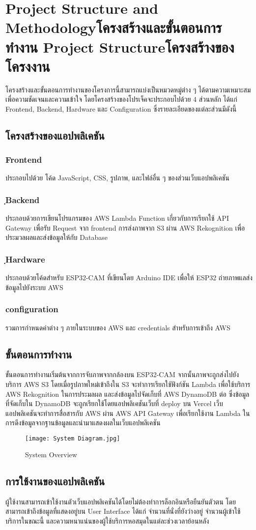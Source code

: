 \chapter{\ifproject%
\ifenglish Project Structure and Methodology\else โครงสร้างและขั้นตอนการทำงาน\fi
\else%
\ifenglish Project Structure\else โครงสร้างของโครงงาน\fi
\fi
}

โครงสร้างและขั้นตอนการทำงานของโครงการนี้สามารถแบ่งเป็นหมวดหมู่ต่าง ๆ ได้ตามความเหมาะสมเพื่อความชัดเจนและความเข้าใจ โดยโครงสร้างของโปรเจ็คจะประกอบไปด้วย 4 ส่วนหลัก ได้แก่ Frontend, Backend, Hardware และ Configuration ซึ่งรายละเอียดของแต่ละส่วนมีดังนี้

\section{โครงสร้างของแอปพลิเคชัน}
\subsection{Frontend}
ประกอบไปด้วย โค้ด JavaScript, CSS, รูปภาพ, และไฟล์อื่น ๆ ของส่วนเว็บแอปพลิเคชัน
\subsection{ฺBackend}
ประกอบด้วยการเขียนโปรแกรมของ AWS Lambda Function เกี่ยวกับการเรียกใช้ API Gateway เพื่อรับ Request จาก frontend การส่งภาพจาก S3 ผ่าน AWS Rekognition เพื่อประมวลผลและส่งข้อมูลให้กับ Database
\subsection{ฺHardware}
ประกอบด้วยโค้ดสำหรับ ESP32-CAM ที่เขียนโดย Arduino IDE เพื่อให้ ESP32 ถ่ายภาพแลส่งข้อมูลไปยังระบบ AWS
\subsection{configuration}
รวมการกำหนดค่าต่าง ๆ ภายในระบบของ AWS และ credentials สำหรับการเข้าถึง AWS
\section{ขั้นตอนการทำงาน}
ขั้นตอนการทำงานเริ่มต้นจากการจับภาพจากกล้องบน ESP32-CAM จากนั้นภาพจะถูกส่งไปยังบริการ AWS S3 โดยเมื่อรูปภาพใหม่เข้าถึงใน S3 จะทำการเรียกใช้ฟังก์ชัน Lambda เพื่อใช้บริการ AWS Rekognition ในการประมลผล และส่งข้อมูลไปจัดเก็บที่ AWS DynamoDB ต่อ ซึ่งข้อมูลที่จัดเก็บใน DynamoDB จะถูกเรียกใช้โดยแอปพลิเคชันเว็บที่ deploy บน Vercel 
เว็บแอปพลิเคชันจะทำการสื่อสารกับ AWS ผ่าน AWS API Gateway เพื่อเรียกใช้งาน Lambda ในการดึงข้อมูลจากฐานข้อมูลและนำมาแสดงผลในเว็บแอปพลิเคชัน
\begin{figure}[h]
\centering
\texttt{[image: System Diagram.jpg]}
\caption[System Overview]{System Overview}
\label{fig:System}
\end{figure}

\section{การใช้งานของแอปพลิเคชัน}
ผู้ใช้งานสามารถเข้าใช้งานตัวเว็บแอปพลิเคชันได้โดยไม่ต้องทำการล็อกอินหรือยืนยันตัวตน โดยสามารถเข้าถึงข้อมูลที่แสดงอยู่บน User Interface ได้แก่ จำนวนที่นั่งที่ยังว่างอยู่ จำนวนผู้เข้าใช้บริการในขณะนี้ 
และความหนาแน่นของผู้ใช้บริการหอสมุดในแต่ละช่วงเวลาย้อนหลัง


